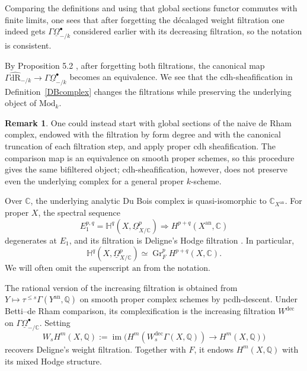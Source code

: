 \documentclass{amsart}
\theoremstyle{plain}
\theoremstyle{definition}
\newtheorem{remark}[prop]{Remark}
\newcommand{\ra}{\rightarrow}
\newcommand{\bbC}{\mathbb{C}}
\newcommand{\Mod}{\mathrm{Mod}}
\DeclareMathOperator{\Gr}{Gr}
\DeclareMathOperator{\im}{im}
\newcommand{\an}{\mathrm{an}}
\newcommand{\dR}{\mathrm{dR}}
\begin{document}
Comparing the definitions and using that global sections functor commutes with finite limits, one sees that after forgetting the d\'ecalaged weight filtration one indeed gets $\Gamma\underline\Omega^\bullet_{-/k}$ considered earlier with its decreasing filtration, so the notation is consistent.

By Proposition 5.2 \cite{Bha12}, after forgetting both filtrations, the canonical map $\Gamma\widehat{\dR}_{-/k}\ra \Gamma\underline\Omega^\bullet_{-/k}$ becomes an equivalence. We see that the cdh-sheafification in Definition~\ref{DBcomplex} changes the filtrations while preserving the underlying object of $\Mod_k$.


\begin{remark}
One could instead start with global sections of the naive de Rham complex, endowed with the filtration by form degree and with the canonical truncation of each filtration step, and apply proper cdh sheafification. The comparison map is an equivalence on smooth proper schemes, so this procedure gives the same bifiltered object;
cdh-sheafification, however, does not preserve even the underlying complex for a general proper $k$-scheme.
\end{remark}

\medskip

Over $\mathbb C$, the underlying analytic Du Bois complex is quasi-isomorphic to $\mathbb C_{X^{\an}}$. For proper $X$, the spectral sequence
\[
E_1^{p,q}=\mathbb H^q(X,\underline\Omega^p_{X/\mathbb C})
 \Longrightarrow H^{p+q}(X^{\an},\mathbb C)
\]
degenerates at $E_1$, and its filtration is Deligne's Hodge filtration
\cite{Del74,DB81}.
In particular,
\begin{equation}\label{eqDBHdR}
\mathbb H^q(X,\underline\Omega^p_{X/\mathbb C})
 \simeq\Gr_F^pH^{p+q}(X,\mathbb C).
\end{equation}
We will often omit the superscript $\an$ from the notation.

The rational version of the increasing filtration is obtained from
$Y\mapsto\tau^{\leq s}\Gamma(Y^{\an},\mathbb Q)$ on smooth proper complex schemes by pcdh-descent.
Under Betti--de Rham comparison, its complexification is the increasing filtration $W^{\mathrm{dec}}$ on $\Gamma\underline\Omega^\bullet_{-/\bbC}$. Setting
\[
W_sH^m(X,\mathbb Q):=
\im\bigl(
 H^m(W^{\mathrm{dec}}_s\Gamma(X,\mathbb Q))
 \longrightarrow H^m(X,\mathbb Q)\bigr)
\]
recovers Deligne's weight filtration. Together with $F$, it endows
$H^m(X,\mathbb Q)$ with its mixed Hodge structure.
\end{document}
